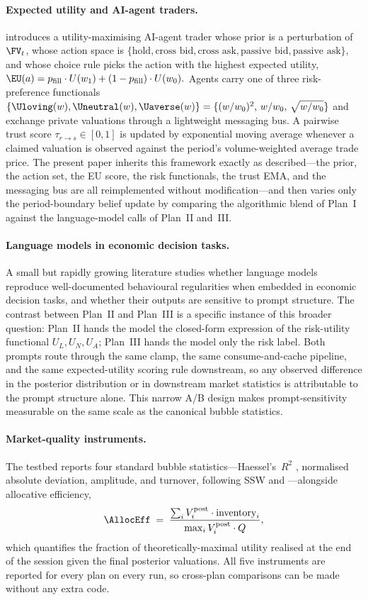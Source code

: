 \paragraph{Expected utility and AI-agent traders.}
\citet{lopezlira2025llm} introduces a utility-maximising AI-agent
trader whose prior is a perturbation of~$\FV_t$, whose action space is
$\{\text{hold},\text{cross bid},\text{cross ask},\text{passive bid},\text{passive ask}\}$,
and whose choice rule picks the action with the highest expected
utility,
$
\EU(a)=p_{\text{fill}}\cdot U(w_1)+(1-p_{\text{fill}})\cdot U(w_0).
$
Agents carry one of three risk-preference functionals
$\{\Uloving(w),\Uneutral(w),\Uaverse(w)\}=
\{(w/w_0)^2,\,w/w_0,\,\sqrt{w/w_0}\}$ and exchange private valuations
through a lightweight messaging bus. A pairwise trust score
$\tau_{r\to s}\in[0,1]$ is updated by exponential moving average
whenever a claimed valuation is observed against the period's
volume-weighted average trade price. The present paper inherits
this framework exactly as described---the prior, the action set,
the EU score, the risk functionals, the trust EMA, and the
messaging bus are all reimplemented without modification---and
then varies only the period-boundary belief update by comparing
the algorithmic blend of Plan~I against the language-model calls
of Plan~II and~III.

\paragraph{Language models in economic decision tasks.}
A small but rapidly growing literature studies whether language
models reproduce well-documented behavioural regularities when
embedded in economic decision tasks, and whether their outputs are
sensitive to prompt structure. The contrast between Plan~II and
Plan~III is a specific instance of this broader question: Plan~II
hands the model the closed-form expression of the risk-utility
functional $U_L, U_N, U_A$; Plan~III hands the model only the risk
label. Both prompts route through the same clamp, the same
consume-and-cache pipeline, and the same expected-utility scoring
rule downstream, so any observed difference in the posterior
distribution or in downstream market statistics is attributable to
the prompt structure alone. This narrow A/B design makes
prompt-sensitivity measurable on the same scale as the canonical
bubble statistics.

\paragraph{Market-quality instruments.} The testbed reports four
standard bubble statistics---Haessel's~$R^2$
\citep{haessel1978measuring}, normalised absolute deviation,
amplitude, and turnover, following SSW and
\citet{stockl2010bubble}---alongside allocative efficiency,
\begin{equation*}
\AllocEff\;=\;\frac{\sum_i V_i^{\text{post}}\cdot\text{inventory}_i}
{\max_i V_i^{\text{post}}\cdot Q},
\end{equation*}
which quantifies the fraction of theoretically-maximal utility
realised at the end of the session given the final posterior
valuations. All five instruments are reported for every plan on
every run, so cross-plan comparisons can be made without any
extra code.
